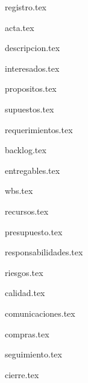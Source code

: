 \documentclass[12pt]{proyecto}
\begin{document}
\maketitle
\thispagestyle{empty}
\pagebreak


\thispagestyle{empty}
{\setlength{\parskip}{0pt}
\tableofcontents{}
}
\pagebreak

{registro.tex}

{acta.tex}

{descripcion.tex}

{interesados.tex}

{propositos.tex}

{supuestos.tex}

{requerimientos.tex}

{backlog.tex}

{entregables.tex}

{wbs.tex}

{recursos.tex}

{presupuesto.tex}
 
{responsabilidades.tex}

{riesgos.tex}

{calidad.tex}

{comunicaciones.tex}

{compras.tex}

{seguimiento.tex}

{cierre.tex}
\end{document}
